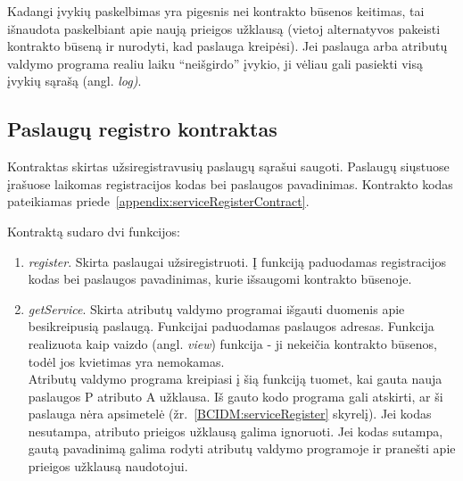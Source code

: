 Kadangi įvykių paskelbimas yra pigesnis nei kontrakto būsenos keitimas, tai išnaudota paskelbiant apie naują prieigos užklausą (vietoj alternatyvos pakeisti
kontrakto būseną ir nurodyti, kad paslauga kreipėsi). Jei paslauga arba atributų valdymo programa realiu laiku \enquote{neišgirdo} įvykio, ji vėliau gali
pasiekti visą įvykių sąrašą (angl. \textit{log)}.

\subsection{Paslaugų registro kontraktas}

Kontraktas skirtas užsiregistravusių paslaugų sąrašui saugoti. Paslaugų siųstuose įrašuose laikomas
registracijos kodas bei paslaugos pavadinimas.
Kontrakto kodas pateikiamas priede\hypertarget{appendix:serviceRegisterContract}{~\ref{appendix:serviceRegisterContract}}.

Kontraktą sudaro dvi funkcijos:

\begin{enumerate}
    \item \textit{register}. Skirta paslaugai užsiregistruoti. Į funkciją paduodamas registracijos kodas bei paslaugos pavadinimas, kurie išsaugomi kontrakto būsenoje.
    \item \textit{getService}. Skirta atributų valdymo programai išgauti duomenis apie besikreipusią paslaugą. Funkcijai paduodamas paslaugos adresas.
    Funkcija realizuota kaip vaizdo (angl. \textit{view}) funkcija - ji nekeičia kontrakto būsenos, todėl jos kvietimas yra nemokamas. \\ 
    Atributų valdymo programa kreipiasi į šią funkciją tuomet, kai gauta nauja paslaugos P atributo A užklausa.
    Iš gauto kodo programa gali atskirti, ar ši paslauga nėra apsimetelė
    (žr.\hypertarget{BCIDM:serviceRegister}{~\ref{BCIDM:serviceRegister} skyrelį}). Jei kodas nesutampa, atributo prieigos užklausą galima ignoruoti. Jei kodas sutampa,
    gautą pavadinimą galima rodyti atributų valdymo programoje ir pranešti apie prieigos užklausą naudotojui.
\end{enumerate}
